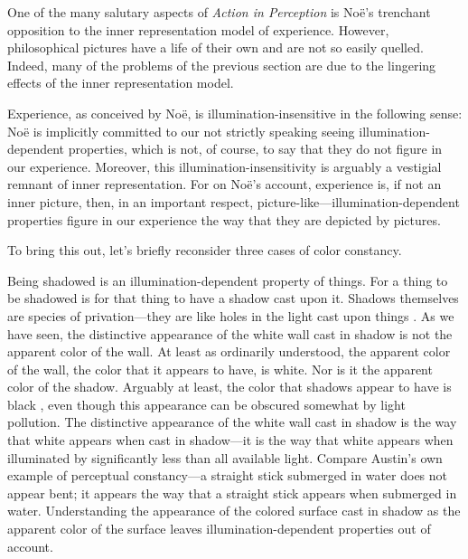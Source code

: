 \documentclass[12pt]{article}
\begin{document}
One of the many salutary aspects of \emph{Action in Perception} is Noë's trenchant opposition to the inner representation model of experience. However, philosophical pictures have a life of their own and are not so easily quelled. Indeed, many of the problems of the previous section are due to the lingering effects of the inner representation model.

Experience, as conceived by Noë, is illumination-insensitive in the following sense: Noë is implicitly committed to our not strictly speaking seeing illumina\-tion-dependent properties, which is not, of course, to say that they do not figure in our experience. Moreover, this illumination-insensitivity is arguably a vestigial remnant of inner representation. For on Noë's account, experience is, if not an inner picture, then, in an important respect, picture-like---illumination-dependent properties figure in our experience the way that they are depicted by pictures. 

To bring this out, let's briefly reconsider three cases of color constancy.

Being shadowed is an illumination-dependent property of things. For a thing to be shadowed is for that thing to have a shadow cast upon it. Shadows themselves are species of privation---they are like holes in the light cast upon things \citep[see][]{Sorensen:2008kx}. As we have seen, the distinctive appearance of the white wall cast in shadow is not the apparent color of the wall. At least as ordinarily understood, the apparent color of the wall, the color that it appears to have, is white. Nor is it the apparent color of the shadow. Arguably at least, the color that shadows appear to have is black \citep{Sorensen:2008kx}, even though this appearance can be obscured somewhat by light pollution. The distinctive appearance of the white wall cast in shadow is the way that white appears when cast in shadow---it is the way that white appears when illuminated by significantly less than all available light. Compare Austin's \citeyearpar{Austin:1962lr} own example of perceptual constancy---a straight stick submerged in water does not appear bent; it appears the way that a straight stick appears when submerged in water. Understanding the appearance of the colored surface cast in shadow as the apparent color of the surface leaves illumination-dependent properties out of account.
\end{document}
